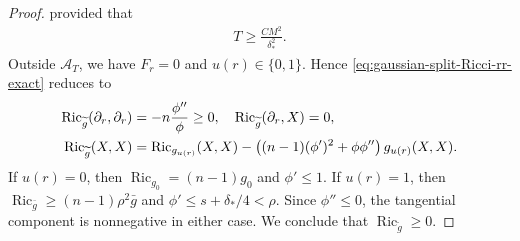\documentclass[11pt,reqno]{amsart}
\numberwithin{equation}{section}
\theoremstyle{definition}
\theoremstyle{remark}
\def\cA {\mathcal{A}}
\newcommand{\0}{\emptyset}
\newcommand{\Ric}{\operatorname{Ric}}
\begin{document}
\begin{proof}
provided that
\begin{align}\label{eq:gaussian-split-T-choice}
        T
        \geq
        \frac{CM^2}{\delta_*^2}.
\end{align}
Outside $\cA_T$, we have $F_r=0$ and $u(r)\in\{0,1\}$. Hence
\eqref{eq:gaussian-split-Ricci-rr-exact} reduces to
\begin{align}
        \Ric_{\widetilde g}(\partial_r,\partial_r)
        &=
        -n\frac{\phi''}{\phi}
        \geq
        0,
        \quad
        \Ric_{\widetilde g}(\partial_r,X)
        =
        0,
        \notag\\
        \Ric_{\widetilde g}(X,X)
        &=
        \Ric_{g_{u(r)}}(X,X)
        -
        \left(
        (n-1)(\phi')^2+\phi\phi''
        \right)g_{u(r)}(X,X).
\end{align}
If $u(r)=0$, then
$\Ric_{g_0}=(n-1)g_0$ and $\phi'\leq1$. If $u(r)=1$, then
$\Ric_{\bar g}\geq(n-1)\rho^2\bar g$ and
$\phi'\leq s+\delta_*/4<\rho$. Since $\phi''\leq0$, the tangential
component is nonnegative in either case. We conclude that $\Ric_{\widetilde g}\geq 0.$

\end{proof}
\end{document}
